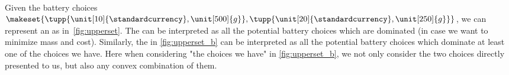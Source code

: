 \begin{marginfigure}
    \\
    \caption{}
\end{marginfigure}
%

Given the battery choices~$\makeset{\tupp{\unit[10]{\standardcurrency},\unit[500]{g}}, \tupp{\unit[20]{\standardcurrency},\unit[250]{g}}}$, we can represent an  as in~\cref{fig:upperset}.
The  can be interpreted as all the potential battery choices which are dominated (in case we want to minimize mass and cost).
Similarly, the  in \cref{fig:upperset_b} can be interpreted as all the potential battery choices which dominate at least one of the choices we have.
Here when considering "the choices we have" in \cref{fig:upperset_b}, we not only consider the two choices directly presented to us, but also any convex combination of them.

